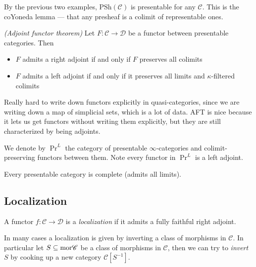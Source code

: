 \documentclass[11pt]{amsart}
\renewcommand{\Pre}{\mathrm{PSh}}
\begin{document}
\begin{example}\label{ex:presheaves-presentable} By the previous two examples, $\Pre(\mathscr{C})$ is presentable for any $\mathscr{C}$. This is the coYoneda lemma --- that any presheaf is a colimit of representable ones.
\end{example}

\begin{theorem}\label{thm:aft} \textit{(Adjoint functor theorem)} Let $F \colon \mathscr{C} \to \mathscr{D}$ be a functor between presentable categories. Then
\begin{itemize}
    \item $F$ admits a right adjoint if and only if $F$ preserves all colimits
    \item $F$ admits a left adjoint if and only if it preserves all limits and $\kappa$-filtered colimits
\end{itemize}
\end{theorem}

Really hard to write down functors explicitly in quasi-categories, since we are writing down a map of simplicial sets, which is a lot of data. AFT is nice because it lets us get functors without writing them explicitly, but they are still characterized by being adjoints.

\begin{notation}\label{nota:PrL}  We denote by $\Pr^L$ the category of presentable $\infty$-categories and colimit-preserving functors between them. Note every functor in $\Pr^L$ is a left adjoint.
\end{notation}

\begin{theorem} Every presentable category is complete (admits all limits).
\end{theorem}


\subsection{Localization}

\begin{definition} \cite[5.2.7.2]{HTT} A functor $f \colon \mathscr{C}\to \mathscr{D}$ is a \textit{localization} if it admits a fully faithful right adjoint.
\end{definition}

In many cases a localization is given by inverting a class of morphisms in $\mathscr{C}$. In particular let $S \subseteq \mathrm{mor} \mathscr{C}$ be a class of morphisms in $\mathscr{C}$, then we can try to \textit{invert} $S$ by cooking up a new category $\mathscr{C}[S^{-1}]$.
\end{document}
